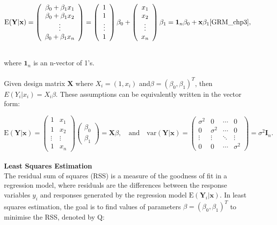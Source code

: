 \documentclass{article}\usepackage[]{graphicx}\usepackage[]{xcolor}
\begin{document}
$$\mathrm{E}(\mathbf{Y} | \mathbf{x}) =
\left( \begin{array}{ccc}
\beta_0+\beta_1 x_1\\
\beta_0+\beta_1 x_2\\
\vdots\\
\beta_0+\beta_1 x_n
\end{array} \right) = 
\left( \begin{array}{ccc}
1\\
1\\
\vdots\\
1
\end{array} \right) \beta_0 + 
\left( \begin{array}{ccc}
x_1\\
x_2\\
\vdots\\
x_n
\end{array} \right) \beta_1 =
\mathbf{1}_n \beta_0 + \mathbf{x} \beta_1 \cite{GRM_chp3},
$$ 

\\
\noindent
where $\mathbf{1}_n$ is an n-vector of 1's.
\\  
\\Given design matrix $\mathbf{X}$ where $X_i = (1, x_i)$ and$\beta = (\beta_0, \beta_1)^T$, then $E(Y_i|x_i) = X_i \beta$. These assumptions can be equivalently written in the vector form:

\[\mathrm{E}(\mathbf{Y} | \mathbf{x}) = 
\left( \begin{array}{cc}
1 & x_1\\
1 & x_2\\
\vdots& \vdots\\
1 & x_n
\end{array} \right) 
\left( \begin{array}{cc}
\beta_0 \\
\beta_1
\end{array} \right) = \mathbf{X} \beta, \quad \text{and} \quad
\text{var}(\mathbf{Y} | \mathbf{x}) =
\begin{pmatrix}
\sigma^2 & 0 & \cdots & 0 \\
0 & \sigma^2 & \cdots & 0 \\
\vdots & \vdots & \ddots & \vdots \\
0 & 0 & \cdots & \sigma^2
\end{pmatrix} = \sigma^2 \mathbf{I}_n.
\]
\\  
\noindent
\textbf{Least Squares Estimation}
\\ \noindent
The residual sum of squares (RSS) is a measure of the goodness of fit in a regression model, where residuals are the differences between the response variables $y_i$ and responses generated by the regression model $\mathrm{E}(\mathbf{Y}_i | \mathbf{x})$. In least squares estimation, the goal is to find values of parameters $\beta = (\beta_0, \beta_1)^T$ to minimise the RSS, denoted by $\mathrm{Q}$: 
\end{document}
